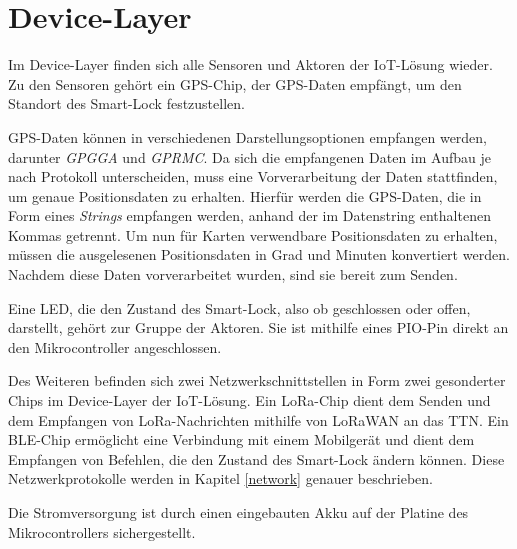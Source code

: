 
\section{Device-Layer}

Im Device-Layer finden sich alle Sensoren und Aktoren der \ac{IoT}-Lösung wieder. Zu den Sensoren gehört ein \ac{GPS}-Chip, der \ac{GPS}-Daten empfängt, um den Standort des Smart-Lock festzustellen. 

\ac{GPS}-Daten können in verschiedenen Darstellungsoptionen empfangen werden, darunter \emph{GPGGA} und \emph{GPRMC}. Da sich die empfangenen Daten im Aufbau je nach Protokoll unterscheiden, muss eine Vorverarbeitung der Daten stattfinden, um genaue Positionsdaten zu erhalten.
Hierfür werden die \ac{GPS}-Daten, die in Form eines \emph{Strings} empfangen werden, anhand der im Datenstring enthaltenen Kommas getrennt.
Um nun für Karten verwendbare Positionsdaten zu erhalten, müssen die ausgelesenen Positionsdaten in Grad und Minuten konvertiert werden. Nachdem diese Daten vorverarbeitet wurden, sind sie bereit zum Senden.

Eine \ac{LED}, die den Zustand des Smart-Lock, also ob geschlossen oder offen, darstellt, gehört zur Gruppe der Aktoren. Sie ist mithilfe eines \ac{PIO}-Pin direkt an den Mikrocontroller angeschlossen.

Des Weiteren befinden sich zwei Netzwerkschnittstellen in Form zwei gesonderter Chips im Device-Layer der \ac{IoT}-Lösung. Ein \ac{LoRa}-Chip dient dem Senden und dem Empfangen von \ac{LoRa}-Nachrichten mithilfe von \ac{LoRaWAN} an das \ac{TTN}. Ein \ac{BLE}-Chip ermöglicht eine Verbindung mit einem Mobilgerät und dient dem Empfangen von Befehlen, 
die den Zustand des Smart-Lock ändern können. Diese Netzwerkprotokolle werden in Kapitel \ref{network} genauer beschrieben.

Die Stromversorgung ist durch einen eingebauten Akku auf der Platine des Mikrocontrollers sichergestellt.